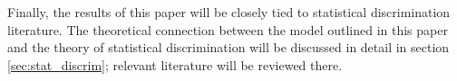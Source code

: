 


Finally, the results of this paper will be closely tied to statistical discrimination literature. 
The theoretical connection between the model outlined in this paper and the theory of statistical discrimination will be discussed in detail in section \ref{sec:stat_discrim}; relevant literature will be reviewed there.
